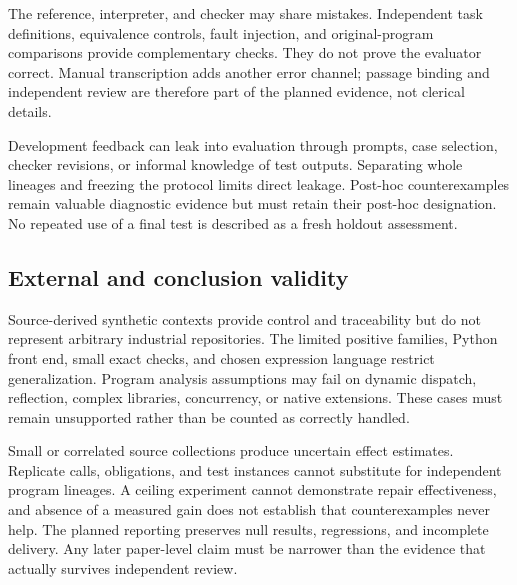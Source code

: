 The reference, interpreter, and checker may share mistakes. Independent task
definitions, equivalence controls, fault injection, and original-program comparisons
provide complementary checks. They do not prove the evaluator correct. Manual
transcription adds another error channel; passage binding and independent review
are therefore part of the planned evidence, not clerical details.

Development feedback can leak into evaluation through prompts, case selection,
checker revisions, or informal knowledge of test outputs. Separating whole
lineages and freezing the protocol limits direct leakage. Post-hoc counterexamples
remain valuable diagnostic evidence but must retain their post-hoc designation.
No repeated use of a final test is described as a fresh holdout assessment.

\subsection{External and conclusion validity}
Source-derived synthetic contexts provide control and traceability but do not
represent arbitrary industrial repositories. The limited positive families,
Python front end, small exact checks, and chosen expression language restrict
generalization. Program analysis assumptions may fail on dynamic dispatch,
reflection, complex libraries, concurrency, or native extensions. These cases
must remain unsupported rather than be counted as correctly handled.

Small or correlated source collections produce uncertain effect estimates.
Replicate calls, obligations, and test instances cannot substitute for independent
program lineages. A ceiling experiment cannot demonstrate repair effectiveness,
and absence of a measured gain does not establish that counterexamples never
help. The planned reporting preserves null results, regressions, and incomplete
delivery. Any later paper-level claim must be narrower than the evidence that
actually survives independent review.
